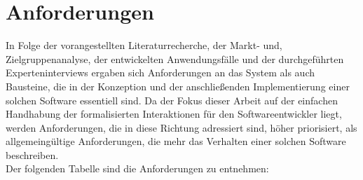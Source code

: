 \section{Anforderungen}
\label{sec:requirementsFinal}
    In Folge der vorangestellten Literaturrecherche, der Markt- und, Zielgruppenanalyse, der entwickelten Anwendungsfälle und 
    der durchgeführten Experteninterviews ergaben sich Anforderungen an das System als auch Bausteine, die in der 
    Konzeption und der anschließenden Implementierung einer solchen Software essentiell sind. Da der Fokus dieser 
    Arbeit auf der einfachen Handhabung der formalisierten Interaktionen für den Softwareentwickler liegt, werden 
    Anforderungen, die in diese Richtung adressiert sind, höher priorisiert, als allgemeingültige Anforderungen, die mehr das 
    Verhalten einer solchen Software beschreiben. 
    \\
    Der folgenden Tabelle sind die Anforderungen zu entnehmen:
